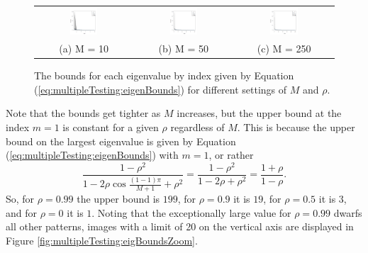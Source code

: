\documentclass[letterpaper,12pt,oneside,final]{article}
\begin{document}
\begin{figure}[htp]
\begin{center}
\begin{tabular}{ccc}
\includegraphics[width = 0.30\textwidth]{./img/m10eigBounds.png} &
\includegraphics[width = 0.30\textwidth]{./img/m50eigBounds.png} &
\includegraphics[width = 0.30\textwidth]{./img/m250eigBounds.png}
\\
{\footnotesize  (a) M = 10 } &  
{\footnotesize  (b) M = 50 }&
{\footnotesize  (c) M = 250 }
\end{tabular}
\end{center}
\caption{The bounds for each eigenvalue by index given by Equation (\ref{eq:multipleTesting:eigenBounds}) for different settings of $M$ and $\rho$.}
\label{fig:multipleTesting:eigBounds}
\end{figure}
Note that the bounds get tighter as $M$ increases, but the upper bound at the index $m = 1$ is constant for a given $\rho$ regardless of $M$. This is because the upper bound on the largest eigenvalue is given by Equation (\ref{eq:multipleTesting:eigenBounds}) with $m = 1$, or rather
$$ \frac{1 - \rho^2}{1 - 2\rho \cos \frac{(1 - 1)\pi}{M+1} + \rho^2} =  \frac{1 - \rho^2}{1 - 2 \rho + \rho^2} = \frac{1 + \rho}{1 - \rho}.$$
So, for $\rho = 0.99$ the upper bound is $199$, for $\rho = 0.9$ it is $19$, for $\rho = 0.5$ it is $3$, and for $\rho = 0$ it is $1$. Noting that the exceptionally large value for $\rho = 0.99$ dwarfs all other patterns, images with a limit of 20 on the vertical axis are displayed in Figure \ref{fig:multipleTesting:eigBoundsZoom}.
\end{document}
